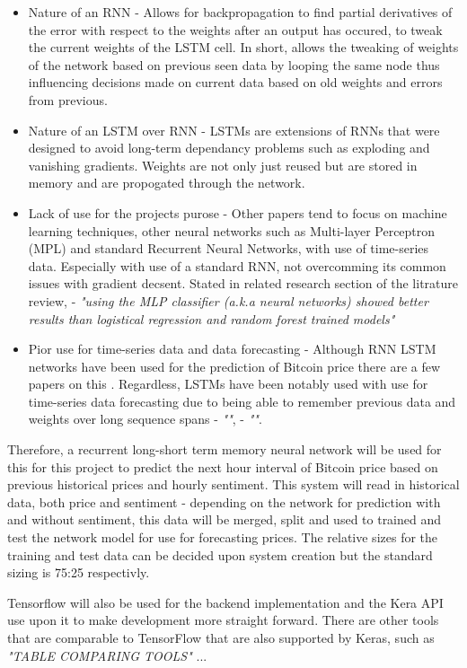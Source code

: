 \documentclass[oneside, 10pt]{article}
\begin{document}
		\begin{itemize}
			\item Nature of an RNN - Allows for backpropagation to find partial derivatives of the error with respect to the weights after an output has occured, to tweak the current weights of the LSTM cell. In short, allows the tweaking of weights of the network based on previous seen data by looping the same node thus influencing decisions made on current data based on old weights and errors from previous.
			\item Nature of an LSTM over RNN - LSTMs are extensions of RNNs \cite{22} that were designed to avoid long-term dependancy problems such as exploding and vanishing gradients. Weights are not only just reused but are stored in memory and are propogated through the network.
			\item Lack of use for the projects purose - Other papers tend to focus on machine learning techniques, other neural networks such as Multi-layer Perceptron (MPL) and standard Recurrent Neural Networks, with use of time-series data. Especially with use of a standard RNN, not overcomming its common issues with gradient decsent. Stated in related research section of the litrature review, \cite{5} - \textit{"using the MLP classifier (a.k.a neural networks) showed better results than logistical regression and random forest trained models"}
			\item Pior use for time-series data and data forecasting - Although RNN LSTM networks have been used for the prediction of Bitcoin price there are a few papers on this \cite{25}. Regardless, LSTMs have been notably used with use for time-series data forecasting due to being able to remember previous data and weights over long sequence spans \cite{22} - \textit{""}, \cite{25} - \textit{""}.
		\end{itemize}
	
		Therefore, a recurrent long-short term memory neural network will be used for this for this project to predict the next hour interval of Bitcoin price based on previous historical prices and hourly sentiment. This system will read in historical data, both price and sentiment - depending on the network for prediction with and without sentiment, this data will be merged, split and used to trained and test the network model for use for forecasting prices. The relative sizes for the training and test data can be decided upon system creation but the standard sizing is 75:25 respectivly.
		
		Tensorflow will also be used for the backend implementation and the Kera API use upon it to make development more straight forward. There are other tools that are comparable to TensorFlow that are also supported by Keras, such as \textit{"TABLE COMPARING TOOLS"} ...
		
\end{document}

